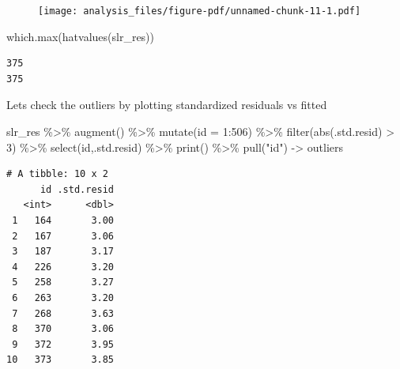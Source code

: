 \documentclass[
  letterpaper,
  DIV=11,
  numbers=noendperiod]{scrreprt}
\newenvironment{Shaded}{\begin{snugshade}}{\end{snugshade}}
\newcommand{\AttributeTok}[1]{\textcolor[rgb]{0.65,0.35,0.00}{#1}}
\newcommand{\DecValTok}[1]{\textcolor[rgb]{0.47,0.16,0.63}{#1}}
\newcommand{\FunctionTok}[1]{\textcolor[rgb]{0.02,0.16,0.49}{#1}}
\newcommand{\NormalTok}[1]{\textcolor[rgb]{0.33,0.33,0.33}{#1}}
\newcommand{\OtherTok}[1]{\textcolor[rgb]{0.85,0.12,0.09}{#1}}
\newcommand{\SpecialCharTok}[1]{\textcolor[rgb]{0.00,0.46,0.62}{#1}}
\newcommand{\StringTok}[1]{\textcolor[rgb]{0.00,0.50,0.00}{#1}}
\begin{document}
\begin{figure}[H]

{\centering \texttt{[image: analysis\_files/figure-pdf/unnamed-chunk-11-1.pdf]}

}

\end{figure}

\begin{Shaded}
\begin{Highlighting}[]
\FunctionTok{which.max}\NormalTok{(}\FunctionTok{hatvalues}\NormalTok{(slr\_res))}
\end{Highlighting}
\end{Shaded}

\begin{verbatim}
375 
375 
\end{verbatim}

Lets check the outliers by plotting standardized residuals vs fitted

\begin{Shaded}
\begin{Highlighting}[]
\NormalTok{slr\_res }\SpecialCharTok{\%\textgreater{}\%} 
  \FunctionTok{augment}\NormalTok{() }\SpecialCharTok{\%\textgreater{}\%} 
  \FunctionTok{mutate}\NormalTok{(}\AttributeTok{id =} \DecValTok{1}\SpecialCharTok{:}\DecValTok{506}\NormalTok{) }\SpecialCharTok{\%\textgreater{}\%} 
  \FunctionTok{filter}\NormalTok{(}\FunctionTok{abs}\NormalTok{(.std.resid) }\SpecialCharTok{\textgreater{}} \DecValTok{3}\NormalTok{) }\SpecialCharTok{\%\textgreater{}\%} 
  \FunctionTok{select}\NormalTok{(id,.std.resid) }\SpecialCharTok{\%\textgreater{}\%} \FunctionTok{print}\NormalTok{() }\SpecialCharTok{\%\textgreater{}\%} 
  \FunctionTok{pull}\NormalTok{(}\StringTok{"id"}\NormalTok{) }\OtherTok{{-}\textgreater{}}\NormalTok{ outliers}
\end{Highlighting}
\end{Shaded}

\begin{verbatim}
# A tibble: 10 x 2
      id .std.resid
   <int>      <dbl>
 1   164       3.00
 2   167       3.06
 3   187       3.17
 4   226       3.20
 5   258       3.27
 6   263       3.20
 7   268       3.63
 8   370       3.06
 9   372       3.95
10   373       3.85
\end{verbatim}
\end{document}
